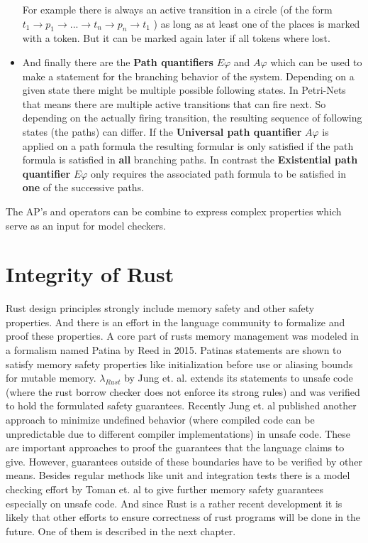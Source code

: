 \begin{itemize}
  For example there is always an active transition in a circle (of the form $t_1\rightarrow p_1 \rightarrow ... \rightarrow t_n \rightarrow p_n \rightarrow t_1$ ) as long as at least one of the places is marked with a token.
  But it can be marked again later if all tokens where lost.
  \item And finally there are the \textbf{Path quantifiers} $E\varphi$ and $A\varphi$ which can be used to make a statement for the branching behavior of the system.
  Depending on a given state there might be multiple possible following states.
  In Petri-Nets that means there are multiple active transitions that can fire next.
  So depending on the actually firing transition, the resulting sequence of following states (the paths) can differ.
  If the \textbf{Universal path quantifier} $A\varphi$ is applied on a path formula the resulting formular is only satisfied if the path formula is satisfied in \textbf{all} branching paths.
  In contrast the \textbf{Existential path quantifier} $E\varphi$ only requires the associated path formula to be satisfied in \textbf{one} of the successive paths.
\end{itemize}
The AP's and operators can be combine to express complex properties which serve as an input for model checkers.

\section{Integrity of Rust}
Rust design principles strongly include memory safety and other safety properties.
And there is an effort in the language community to formalize and proof these properties.
A core part of rusts memory management was modeled in a formalism named Patina by Reed\cite{reed2015patina} in 2015.
Patinas statements are shown to satisfy memory safety properties like initialization before use or aliasing bounds for mutable memory.
$\lambda_{Rust}$ by Jung et. al.\cite{Jung:2017:RSF:3177123.3158154} extends its statements to unsafe code (where the rust borrow checker does not enforce its strong rules) and was verified to hold the formulated safety guarantees.
Recently Jung et. al published another approach to minimize undefined behavior (where compiled code can be unpredictable due to different compiler implementations) in unsafe code.
These are important approaches to proof the guarantees that the language claims to give.
However, guarantees outside of these boundaries have to be verified by other means.
Besides regular methods like unit and integration tests there is a model checking effort by Toman et. al \cite{toman2015crust} to give further memory safety guarantees especially on unsafe code.
And since Rust is a rather recent development it is likely that other efforts to ensure correctness of rust programs will be done in the future.
One of them is described in the next chapter.